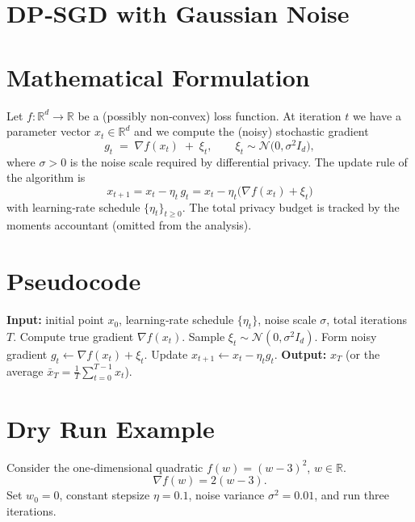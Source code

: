 \documentclass{article}
\newcommand{\R}{\mathbb{R}}
\begin{document}
\section*{DP‑SGD with Gaussian Noise}

\section*{Mathematical Formulation}
Let $f:\R^{d}\rightarrow\R$ be a (possibly non‑convex) loss function.  
At iteration $t$ we have a parameter vector $x_{t}\in\R^{d}$ and we compute the
(noisy) stochastic gradient
\[
g_{t}\;=\;\nabla f(x_{t})\;+\;\xi_{t},\qquad 
\xi_{t}\sim\mathcal{N}\!\big(0,\sigma^{2} I_{d}\big),
\]
where $\sigma>0$ is the noise scale required by differential privacy.
The update rule of the algorithm is
\[
\boxed{\;x_{t+1}=x_{t}-\eta_{t}\,g_{t}
      =x_{t}-\eta_{t}\big(\nabla f(x_{t})+\xi_{t}\big)\;}
\tag{1}
\]
with learning‑rate schedule $\{\eta_{t}\}_{t\ge 0}$.
The total privacy budget is tracked by the moments accountant (omitted from the
analysis).

\section*{Pseudocode}
\begin{algorithm}[H]
\caption{DP‑SGD with Gaussian Noise}
\begin{algorithmic}[1]
\STATE \textbf{Input:} initial point $x_{0}$, learning‑rate schedule $\{\eta_{t}\}$, noise scale $\sigma$, total iterations $T$.
    \STATE Compute true gradient $\nabla f(x_{t})$.
    \STATE Sample $\xi_{t}\sim\mathcal N(0,\sigma^{2}I_{d})$.
    \STATE Form noisy gradient $g_{t}\gets \nabla f(x_{t})+\xi_{t}$.
    \STATE Update $x_{t+1}\gets x_{t}-\eta_{t} g_{t}$.
\ENDFOR
\STATE \textbf{Output:} $x_{T}$ (or the average $\bar x_{T}= \tfrac1T\sum_{t=0}^{T-1}x_{t}$).
\end{algorithmic}
\end{algorithm}

\section*{Dry Run Example}
Consider the one‑dimensional quadratic $f(w)=(w-3)^{2}$, $w\in\R$.
\[
\nabla f(w)=2(w-3).
\]
Set $w_{0}=0$, constant stepsize $\eta=0.1$, noise variance $\sigma^{2}=0.01$,
and run three iterations.
\end{document}
